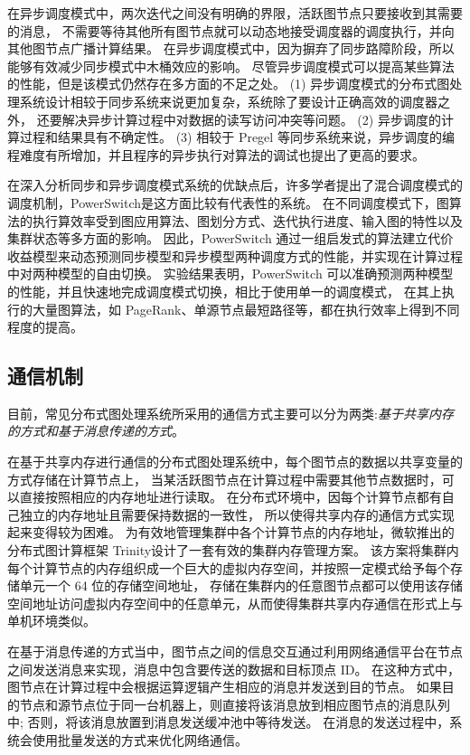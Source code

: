 在异步调度模式中，两次迭代之间没有明确的界限，活跃图节点只要接收到其需要的消息，
不需要等待其他所有图节点就可以动态地接受调度器的调度执行，并向其他图节点广播计算结果。
在异步调度模式中，因为摒弃了同步路障阶段，所以能够有效减少同步模式中木桶效应的影响。
尽管异步调度模式可以提高某些算法的性能，但是该模式仍然存在多方面的不足之处。
(1) 异步调度模式的分布式图处理系统设计相较于同步系统来说更加复杂，系统除了要设计正确高效的调度器之外，
还要解决异步计算过程中对数据的读写访问冲突等问题。
(2) 异步调度的计算过程和结果具有不确定性。
(3) 相较于 Pregel 等同步系统来说，异步调度的编程难度有所增加，并且程序的异步执行对算法的调试也提出了更高的要求。

在深入分析同步和异步调度模式系统的优缺点后，许多学者提出了混合调度模式的调度机制，PowerSwitch\cite{Xie@PPoPP15}是这方面比较有代表性的系统。
在不同调度模式下，图算法的执行算效率受到图应用算法、图划分方式、迭代执行进度、输入图的特性以及集群状态等多方面的影响。
因此，PowerSwitch 通过一组启发式的算法建立代价收益模型来动态预测同步模型和异步模型两种调度方式的性能，并实现在计算过程中对两种模型的自由切换。
实验结果表明，PowerSwitch 可以准确预测两种模型的性能，并且快速地完成调度模式切换，相比于使用单一的调度模式，
在其上执行的大量图算法，如 PageRank、单源节点最短路径等，都在执行效率上得到不同程度的提高。

\subsection{通信机制}

目前，常见分布式图处理系统所采用的通信方式主要可以分为两类:\textit{基于共享内存的方式和基于消息传递的方式}。
        
在基于共享内存进行通信的分布式图处理系统中，每个图节点的数据以共享变量的方式存储在计算节点上，
当某活跃图节点在计算过程中需要其他节点数据时，可以直接按照相应的内存地址进行读取。
在分布式环境中，因每个计算节点都有自己独立的内存地址且需要保持数据的一致性，
所以使得共享内存的通信方式实现起来变得较为困难。
为有效地管理集群中各个计算节点的内存地址，微软推出的分布式图计算框架 Trinity\cite{Shao@SIGMOD13}设计了一套有效的集群内存管理方案。
该方案将集群内每个计算节点的内存组织成一个巨大的虚拟内存空间，并按照一定模式给予每个存储单元一个 64 位的存储空间地址，
存储在集群内的任意图节点都可以使用该存储空间地址访问虚拟内存空间中的任意单元，从而使得集群共享内存通信在形式上与单机环境类似。

在基于消息传递的方式当中，图节点之间的信息交互通过利用网络通信平台在节点之间发送消息来实现，消息中包含要传送的数据和目标顶点 ID。
在这种方式中，图节点在计算过程中会根据运算逻辑产生相应的消息并发送到目的节点。
如果目的节点和源节点位于同一台机器上，则直接将该消息放到相应图节点的消息队列中;
否则，将该消息放置到消息发送缓冲池中等待发送。
在消息的发送过程中，系统会使用批量发送的方式来优化网络通信。

